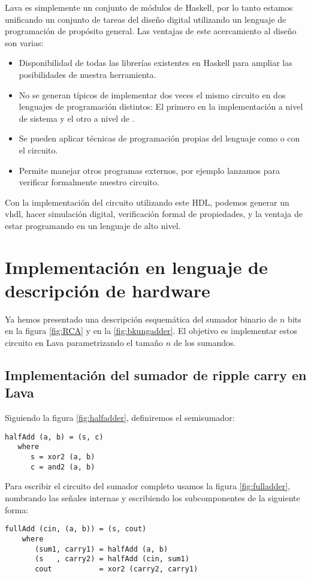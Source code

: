 Lava es simplemente un conjunto de módulos de Haskell, por lo tanto estamos unificando un conjunto de tareas del diseño digital utilizando un lenguaje de programación de propósito general. Las ventajas de este acercamiento al diseño son varias: 

\begin{itemize}
\item Disponibilidad de todas las librerías existentes en Haskell para ampliar las posibilidades de nuestra herramienta.
\item No se generan  típicos de implementar dos veces el mismo circuito en dos lenguajes de programación distintos: El primero en la implementación a nivel de sistema y el otro a nivel de .
\item Se pueden aplicar técnicas de programación propias del lenguaje como  o  con el circuito.
\item Permite manejar otros programas externos, por ejemplo lanzamos \cite{minisat} para verificar formalmente nuestro circuito.  
\end{itemize}


Con la implementación del circuito utilizando este HDL, podemos generar un  \gls{vhdl}, hacer simulación digital, verificación formal de propiedades, y la ventaja de estar programando en un lenguaje de alto nivel. 


\section{Implementación en lenguaje de descripción de hardware}
Ya hemos presentado una descripción esquemática del sumador binario de \(n\) bits en la figura \ref{fig:RCA} y en la \ref{fig:bkungadder}. El objetivo es implementar estos circuito en Lava parametrizando el tamaño \(n\) de los sumandos. 

\subsection{Implementación del sumador de \textbf {ripple carry} en Lava}

\noindent Siguiendo la figura \ref{fig:halfadder}, definiremos el semisumador:
\begin{lstlisting}
halfAdd (a, b) = (s, c)
   where
      s = xor2 (a, b)
      c = and2 (a, b)
\end{lstlisting}
\noindent Para escribir el circuito del sumador completo usamos la figura \ref{fig:fulladder}, nombrando las señales internas y 
escribiendo los subcomponentes de la siguiente forma:
\begin{lstlisting}
fullAdd (cin, (a, b)) = (s, cout)
    where
       (sum1, carry1) = halfAdd (a, b)
       (s   , carry2) = halfAdd (cin, sum1)
       cout           = xor2 (carry2, carry1)
\end{lstlisting}

